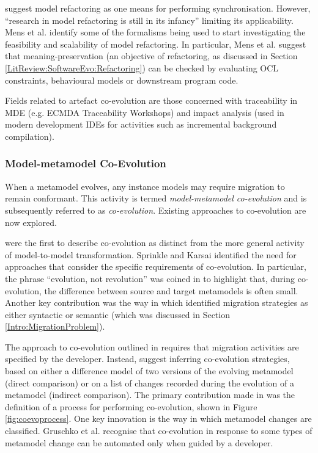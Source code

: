 \cite{mens07modelrefactoring} suggest model refactoring as one means for performing synchronisation. However, ``research in model refactoring is still in its infancy'' \cite{mens07modelrefactoring} limiting its applicability. Mens et al. identify some of the formalisms being used to start investigating the feasibility and scalability of model refactoring. In particular, Mens et al. suggest that meaning-preservation (an objective of refactoring, as discussed in Section \ref{LitReview:SoftwareEvo:Refactoring}) can be checked by evaluating OCL constraints, behavioural models or downstream program code.

Fields related to artefact co-evolution are those concerned with traceability in MDE (e.g. ECMDA Traceability Workshops) and impact analysis (used in modern development IDEs for activities such as incremental background compilation).

\subsubsection{Model-metamodel Co-Evolution}
\label{LitReview:ModelCoEvo}
When a metamodel evolves, any instance models may require migration to remain conformant. This activity is termed \textit{model-metamodel co-evolution} and is subsequently referred to as \emph{co-evolution}. Existing approaches to co-evolution are now explored.

\cite{sprinkle04domain} were the first to describe co-evolution as distinct from the more general activity of model-to-model transformation. Sprinkle and Karsai identified the need for approaches that consider the specific requirements of co-evolution. In particular, the phrase ``evolution, not revolution'' was coined in \cite{sprinkle03thesis} to highlight that, during co-evolution, the difference between source and target metamodels is often small. Another key contribution was the way in which \cite{sprinkle04domain} identified migration strategies as either syntactic or semantic (which was discussed in Section \ref{Intro:MigrationProblem}).

The approach to co-evolution outlined in \cite{sprinkle04domain} requires that migration activities are specified by the developer. Instead, \cite{gruschko07towards} suggest inferring co-evolution strategies, based on either a difference model of two versions of the evolving metamodel (direct comparison) or on a list of changes recorded during the evolution of a metamodel (indirect comparison). The primary contribution made in \cite{sprinkle04domain} was the definition of a process for performing co-evolution, shown in Figure \ref{fig:coevoprocess}. One key innovation is the way in which metamodel changes are classified. Gruschko et al. recognise that co-evolution in response to some types of metamodel change can be automated only when guided by a developer.

